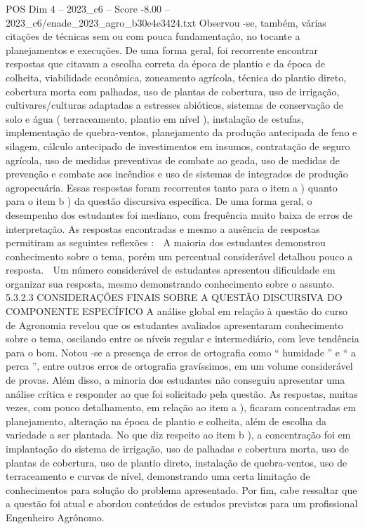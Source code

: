 \begin{textsample}{POS Dim 4 – 2023\_c6 – Score -8.00 – 2023\_c6/enade\_2023\_agro\_b30e4e3424.txt}
Observou -se, também, várias citações de técnicas sem ou com pouca fundamentação, no tocante a planejamentos e execuções.
De uma forma geral, foi recorrente encontrar respostas que citavam a escolha correta da época de plantio e da época de colheita, viabilidade econômica, zoneamento agrícola, técnica do plantio direto, cobertura morta com palhadas, uso de plantas de cobertura, uso de irrigação, cultivares/culturas adaptadas a estresses abióticos, sistemas de conservação de solo e água ( terraceamento, plantio em nível ), instalação de estufas, implementação de quebra-ventos, planejamento da produção antecipada de feno e silagem, cálculo antecipado de investimentos em insumos, contratação de seguro agrícola, uso de medidas preventivas de combate ao geada, uso de medidas de prevenção e combate aos incêndios e uso de sistemas de integrados de produção agropecuária.
Essas respostas foram recorrentes tanto para o item a ) quanto para o item b ) da questão discursiva específica.
De uma forma geral, o desempenho dos estudantes foi mediano, com frequência muito baixa de erros de interpretação.
As respostas encontradas e mesmo a ausência de respostas permitiram as seguintes reflexões :  A maioria dos estudantes demonstrou conhecimento sobre o tema, porém um percentual considerável detalhou pouco a resposta.  Um número considerável de estudantes apresentou dificuldade em organizar sua resposta, mesmo demonstrando conhecimento sobre o assunto. 5.3.2.3 CONSIDERAÇÕES FINAIS SOBRE A QUESTÃO DISCURSIVA DO COMPONENTE ESPECÍFICO A análise global em relação à questão do curso de Agronomia revelou que os estudantes avaliados apresentaram conhecimento sobre o tema, oscilando entre os níveis regular e intermediário, com leve tendência para o bom.
Notou -se a presença de erros de ortografia como “ humidade ” e “ a perca ”, entre outros erros de ortografia gravíssimos, em um volume considerável de provas.
Além disso, a minoria dos estudantes não conseguiu apresentar uma análise crítica e responder ao que foi solicitado pela questão.
As respostas, muitas vezes, com pouco detalhamento, em relação ao item a ), ficaram concentradas em planejamento, alteração na época de plantio e colheita, além de escolha da variedade a ser plantada.
No que diz respeito ao item b ), a concentração foi em implantação do sistema de irrigação, uso de palhadas e cobertura morta, uso de plantas de cobertura, uso de plantio direto, instalação de quebra-ventos, uso de terraceamento e curvas de nível, demonstrando uma certa limitação de conhecimentos para solução do problema apresentado.
Por fim, cabe ressaltar que a questão foi atual e abordou conteúdos de estudos previstos para um profissional Engenheiro Agrônomo.

\end{textsample}

